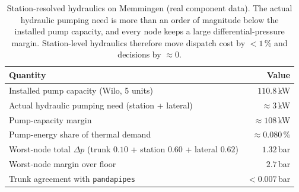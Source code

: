 \begin{table}[t]
\centering
\caption{Station-resolved hydraulics on Memmingen (real component data). The actual hydraulic
pumping need is more than an order of magnitude below the installed pump capacity, and every node keeps a
large differential-pressure margin. Station-level hydraulics therefore move dispatch cost by
$<1$\,\% and decisions by $\approx 0$.}
\label{tab:hydraulics}
\begin{tabular}{lr}
\hline
Quantity & Value \\
\hline
Installed pump capacity (Wilo, 5 units) & $110.8$\,kW \\
Actual hydraulic pumping need (station + lateral) & $\approx 3$\,kW \\
Pump-capacity margin & $\approx 108$\,kW \\
Pump-energy share of thermal demand & $\approx 0.080$\,\% \\
Worst-node total $\Delta p$ (trunk $0.10$ + station $0.60$ + lateral $0.62$) & $1.32$\,bar \\
Worst-node margin over floor & $2.7$\,bar \\
Trunk agreement with \texttt{pandapipes} & $<0.007$\,bar \\
\hline
\end{tabular}
\end{table}
